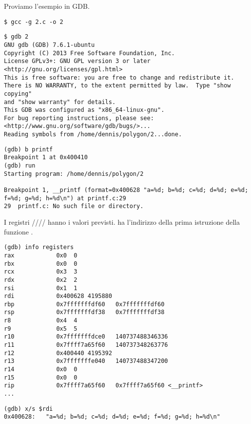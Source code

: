 
Proviamo l'esempio in \ac{GDB}.

\begin{lstlisting}
$ gcc -g 2.c -o 2
\end{lstlisting}

\begin{lstlisting}
$ gdb 2
GNU gdb (GDB) 7.6.1-ubuntu
Copyright (C) 2013 Free Software Foundation, Inc.
License GPLv3+: GNU GPL version 3 or later <http://gnu.org/licenses/gpl.html>
This is free software: you are free to change and redistribute it.
There is NO WARRANTY, to the extent permitted by law.  Type "show copying"
and "show warranty" for details.
This GDB was configured as "x86_64-linux-gnu".
For bug reporting instructions, please see:
<http://www.gnu.org/software/gdb/bugs/>...
Reading symbols from /home/dennis/polygon/2...done.
\end{lstlisting}

\begin{lstlisting}[caption=impostiamo il breakpoint su \printf{,} e avviamo]
(gdb) b printf
Breakpoint 1 at 0x400410
(gdb) run
Starting program: /home/dennis/polygon/2 

Breakpoint 1, __printf (format=0x400628 "a=%d; b=%d; c=%d; d=%d; e=%d; f=%d; g=%d; h=%d\n") at printf.c:29
29	printf.c: No such file or directory.
\end{lstlisting}

I registri \RSI/\RDX/\RCX// hanno i valori previsti.
\RIP ha l'indirizzo della prima istruzione della funzione \printf.

\begin{lstlisting}
(gdb) info registers
rax            0x0	0
rbx            0x0	0
rcx            0x3	3
rdx            0x2	2
rsi            0x1	1
rdi            0x400628	4195880
rbp            0x7fffffffdf60	0x7fffffffdf60
rsp            0x7fffffffdf38	0x7fffffffdf38
r8             0x4	4
r9             0x5	5
r10            0x7fffffffdce0	140737488346336
r11            0x7ffff7a65f60	140737348263776
r12            0x400440	4195392
r13            0x7fffffffe040	140737488347200
r14            0x0	0
r15            0x0	0
rip            0x7ffff7a65f60	0x7ffff7a65f60 <__printf>
...
\end{lstlisting}

\begin{lstlisting}[caption=ispezioniamo la format string]
(gdb) x/s $rdi
0x400628:	"a=%d; b=%d; c=%d; d=%d; e=%d; f=%d; g=%d; h=%d\n"
\end{lstlisting}

